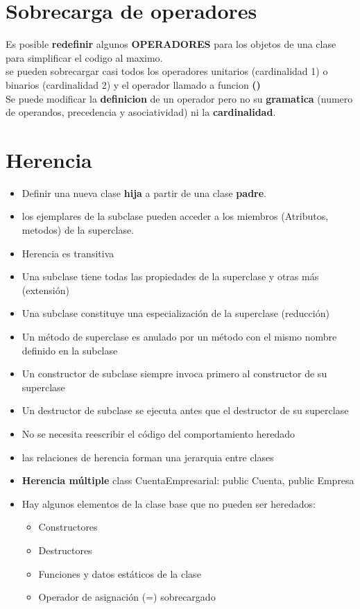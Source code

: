 \documentclass[11pt]{article}
\begin{document}
\section{Sobrecarga de operadores}
Es posible \textbf{redefinir} algunos \textbf{OPERADORES} para los objetos de una clase para simplificar el codigo al maximo.\\
se pueden sobrecargar casi todos los operadores unitarios (cardinalidad 1) o binarios (cardinalidad 2) y el operador llamado a funcion \textbf{()}\\
Se puede modificar la \textbf{definicion} de un operador pero no su \textbf{gramatica} (numero de operandos, precedencia y asociatividad) ni la \textbf{cardinalidad}.
\section{Herencia}
\begin{itemize}
	\item Definir una nueva clase \textbf{hija} a partir de una clase \textbf{padre}.
	\item los ejemplares de la subclase pueden acceder a los miembros (Atributos, metodos) de la superclase.
	\item Herencia es transitiva
	\item Una subclase tiene todas las propiedades de la superclase y otras más (extensión)
	\item Una subclase constituye una especialización de la superclase (reducción)
	\item Un método de superclase es anulado por un método con el mismo nombre definido en la subclase
	\item Un constructor de subclase siempre invoca primero al constructor de su superclase 
	\item Un destructor de subclase se ejecuta antes que el destructor de su superclase
	\item No se necesita reescribir el código del comportamiento heredado
	\item las relaciones de herencia forman una jerarquia entre clases
	\item \textbf{Herencia múltiple} class CuentaEmpresarial: public Cuenta, public Empresa
	\item Hay algunos elementos de la clase base que no pueden ser heredados:
	\begin{itemize}
		\item Constructores
		\item Destructores
		\item Funciones y datos estáticos de la clase
		\item Operador de asignación (=) sobrecargado
	\end{itemize}
\end{itemize}
\end{document}
